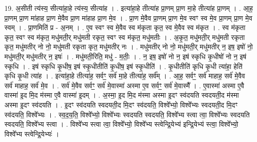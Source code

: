 \documentclass[17pt]{extarticle}
\begin{document}
19. अ॒सीती त्य॑स्य॒ सीत्या॑हा॒हे त्य॑स्य॒ सीत्या॑ह । . इत्या॑हा॒हे तीत्या॑ह प्रा॒णम् प्रा॒ण मा॒हे तीत्या॑ह प्रा॒णम् । . आ॒ह॒ प्रा॒णम् प्रा॒ण मा॑हाह प्रा॒ण मे॒वैव प्रा॒ण मा॑हाह प्रा॒ण मे॒व । . प्रा॒ण मे॒वैव प्रा॒णम् प्रा॒ण मे॒व स्वꣳ स्व मे॒व प्रा॒णम् प्रा॒ण मे॒व स्वम् । . प्रा॒णमिति॑ प्र - अ॒नम् । . ए॒व स्वꣳ स्व मे॒वैव स्व म॑कृता कृत॒ स्व मे॒वैव स्व म॑कृत । . स्व म॑कृता कृत॒ स्वꣳ स्व म॑कृत॒ मधु॑मती॒र् मधु॑मती रकृत॒ स्वꣳ स्व म॑कृत॒ मधु॑मतीः । . अ॒कृ॒त॒ मधु॑मती॒र् मधु॑मती रकृता कृत॒ मधु॑मतीर् नो नो॒ मधु॑मती रकृता कृत॒ मधु॑मतीर् नः । . मधु॑मतीर् नो नो॒ मधु॑मती॒र् मधु॑मतीर् न॒ इष॒ इषो॑ नो॒ मधु॑मती॒र् मधु॑मतीर् न॒ इषः॑ । . मधु॑मती॒रिति॒ मधु॑ - म॒तीः॒ । . न॒ इष॒ इषो॑ नो न॒ इष॑ स्कृधि कृ॒धीषो॑ नो न॒ इष॑ स्कृधि । . इष॑ स्कृधि कृ॒धीष॒ इष॑ स्कृ॒धीतीति॑ कृ॒धीष॒ इष॑ स्कृ॒धीति॑ । . कृ॒धीतीति॑ कृधि कृ॒धी त्या॑हा॒ हेति॑ कृधि कृ॒धी त्या॑ह । . इत्या॑हा॒हे तीत्या॑ह॒ सर्वꣳ॒॒ सर्व॑ मा॒हे तीत्या॑ह॒ सर्व᳚म् । . आ॒ह॒ सर्वꣳ॒॒ सर्व॑ माहाह॒ सर्व॑ मे॒वैव सर्व॑ माहाह॒ सर्व॑ मे॒व । . सर्व॑ मे॒वैव सर्वꣳ॒॒ सर्व॑ मे॒वास्मा॑ अस्मा ए॒व सर्वꣳ॒॒ सर्व॑ मे॒वास्मै᳚ । . ए॒वास्मा॑ अस्मा ए॒वै वास्मा॑ इ॒द मि॒द म॑स्मा ए॒वै वास्मा॑ इ॒दम् । . अ॒स्मा॒ इ॒द मि॒द म॑स्मा अस्मा इ॒दꣳ स्व॑दयति स्वदयती॒द म॑स्मा अस्मा इ॒दꣳ स्व॑दयति । . इ॒दꣳ स्व॑दयति स्वदयती॒द मि॒दꣳ स्व॑दयति॒ विश्वे᳚भ्यो॒ विश्वे᳚भ्यः स्वदयती॒द मि॒दꣳ स्व॑दयति॒ विश्वे᳚भ्यः । . स्व॒द॒य॒ति॒ विश्वे᳚भ्यो॒ विश्वे᳚भ्यः स्वदयति स्वदयति॒ विश्वे᳚भ्य स्त्वा त्वा॒ विश्वे᳚भ्यः स्वदयति स्वदयति॒ विश्वे᳚भ्य स्त्वा । . विश्वे᳚भ्य स्त्वा त्वा॒ विश्वे᳚भ्यो॒ विश्वे᳚भ्य स्त्वेन्द्रि॒येभ्य॑ इन्द्रि॒येभ्य॑ स्त्वा॒ विश्वे᳚भ्यो॒ विश्वे᳚भ्य स्त्वेन्द्रि॒येभ्यः॑ । \newline
\end{document}
